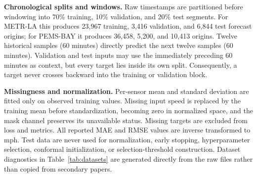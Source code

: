 \documentclass[pdflatex,sn-mathphys-num]{sn-jnl}
\begin{document}
\textbf{Chronological splits and windows.} Raw timestamps are partitioned
before windowing into 70\% training, 10\% validation, and 20\% test segments.
For METR-LA this produces 23,967 training, 3,416 validation, and 6,844 test
forecast origins; for PEMS-BAY it produces 36,458, 5,200, and 10,413 origins.
Twelve historical samples (60 minutes) directly predict the next twelve
samples (60 minutes). Validation and test inputs may use the immediately
preceding 60 minutes as context, but every target lies inside its own split.
Consequently, a target never crosses backward into the training or validation
block.

\textbf{Missingness and normalization.} Per-sensor mean and standard deviation
are fitted only on observed training values. Missing input speed is replaced by
the training mean before standardization, becoming zero in normalized space,
and the mask channel preserves its unavailable status. Missing targets are
excluded from loss and metrics. All reported MAE and RMSE values are inverse
transformed to mph. Test data are never used for normalization, early stopping,
hyperparameter selection, conformal initialization, or selection-threshold
construction. Dataset diagnostics in Table~\ref{tab:datasets} are generated
directly from the raw files rather than copied from secondary papers.
\begin{table}[t]
  \centering
  \caption{Dataset diagnostics computed from checksum-verified raw files.
  Speed is in miles per hour; correlations use observed values at 5-minute and
  one-day lags.}
  \label{tab:datasets}
\end{table}
\end{document}

